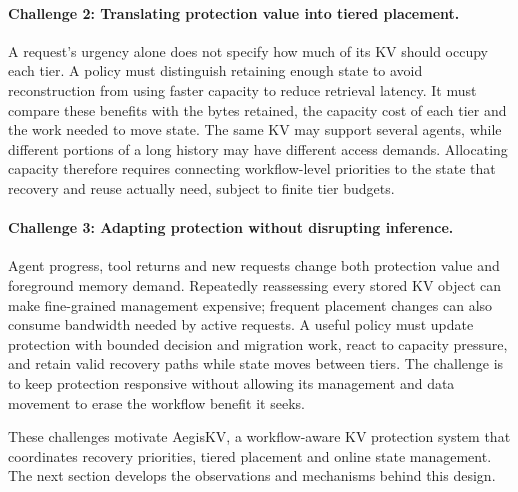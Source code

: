 \paragraph{Challenge 2: Translating protection value into tiered placement.}
A request's urgency alone does not specify how much of its KV should
occupy each tier. A policy must distinguish retaining enough state to
avoid reconstruction from using faster capacity to reduce retrieval
latency. It must compare these benefits with the bytes retained, the
capacity cost of each tier and the work needed to move state.
The same KV may support several agents, while different portions of a
long history may have different access demands. Allocating capacity
therefore requires connecting workflow-level priorities to the state
that recovery and reuse actually need, subject to finite tier budgets.

\paragraph{Challenge 3: Adapting protection without disrupting inference.}
Agent progress, tool returns and new requests change both protection
value and foreground memory demand. Repeatedly reassessing every stored
KV object can make fine-grained management expensive; frequent placement
changes can also consume bandwidth needed by active requests.
A useful policy must update protection with bounded decision and
migration work, react to capacity pressure, and retain valid recovery
paths while state moves between tiers. The challenge is to keep
protection responsive without allowing its management and data movement
to erase the workflow benefit it seeks.

\label{sec:motivation-goals}
These challenges motivate AegisKV, a workflow-aware KV protection system
that coordinates recovery priorities, tiered placement and online state
management. The next section develops the observations and mechanisms
behind this design.
